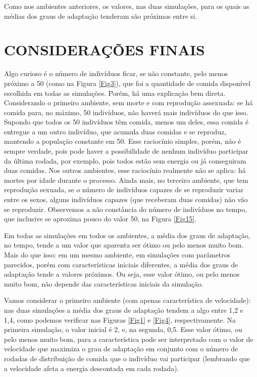 \documentclass[10pt,brazil,english]{article}
\begin{document}
        Como nos ambientes anteriores, os valores, nas duas simulações, para os quais as médias dos graus de adaptação tenderam são próximos entre si.
    
    \section{\uppercase{Considerações Finais}}
    
        Algo curioso é o número de indivíduos ficar, se não constante, pelo menos próximo a 50 (como na Figura \ref{Fig3}), que foi a quantidade de comida disponível escolhida em todas as simulações. Porém, há uma explicação bem direta. Considerando o primeiro ambiente, sem morte e com reprodução assexuada: se há comida para, no máximo, 50 indivíduos, não haverá mais indivíduos do que isso. Supondo que todos os 50 indivíduos têm comida, menos um deles, essa comida é entregue a um outro indivíduo, que acumula duas comidas e se reproduz, mantendo a população constante em 50. Esse raciocínio simples, porém, não é sempre verdade, pois pode haver a possibilidade de nenhum indivíduo participar da última rodada, por exemplo, pois todos estão sem energia ou já conseguiram duas comidas. Nos outros ambientes, esse raciocínio realmente não se aplica: há mortes por idade durante o processo. Ainda mais, no terceiro ambiente, que tem reprodução sexuada, se o número de indivíduos capazes de se reproduzir variar entre os sexos, alguns indivíduos capazes (que receberam duas comidas) não vão se reproduzir. Observemos a não constância do número de indivíduos no tempo, que inclusive se aproxima pouco do valor 50, na Figura \ref{Fig15}. 
    
        Em todas as simulações em todos os ambientes, a média dos graus de adaptação, no tempo, tende a um valor que aparenta ser ótimo ou pelo menos muito bom. Mais do que isso: em um mesmo ambiente, em simulações com parâmetros parecidos, porém com características iniciais diferentes, a média dos graus de adaptação tende a valores próximos. Ou seja, esse valor ótimo, ou pelo menos muito bom, não depende das características iniciais da simulação.
        
        Vamos considerar o primeiro ambiente (com apenas característica de velocidade): nas duas simulações a média dos graus de adaptação tendem a algo entre 1,2 e 1,4, como podemos verificar nas Figuras \ref{Fig1} e \ref{Fig4}, respectivamente. Na primeira simulação, o valor inicial é 2, e, na segunda, 0,5. Esse valor ótimo, ou pelo menos muito bom, para a característica pode ser interpretado com o valor de velocidade que maximiza o grau de adaptação em conjunto com o número de rodadas de distribuição de comida que o indivíduo vai participar (lembrando que a velocidade afeta a energia descontada em cada rodada).
        
\end{document}
